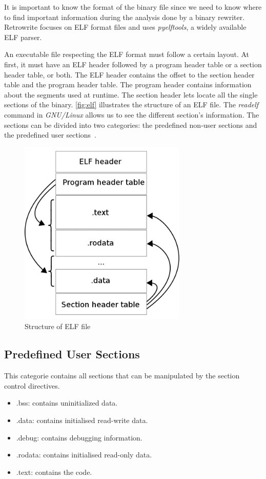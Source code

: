 \documentclass[a4paper,11pt,oneside]{report}
\newcommand{\sysname}{Retrowrite\xspace}
\begin{document}
It is important to know the format of the binary file since we need to know
where to find important information during the analysis done by a binary
rewriter. \sysname focuses on ELF format files and uses \textit{pyelftools}, a
widely available ELF parser.


An executable file respecting the ELF format must follow a certain layout. At
first, it must have an ELF header followed by a program header table or a section
header table, or both. 
The ELF header contains the offset to the section header table and the program
header table. The program header contains information about the segments used
at runtime. The section header lets locate all the single sections of the
binary. \autoref{fig:elf} illustrates the structure of an ELF file. The
\textit{readelf}~\cite{readelfMan} command in \textit{GNU/Linux} allows us to
see the different section's information. The sections can be divided into two
categories: the predefined non-user sections and the predefined user
sections~\cite{sparc}.

\begin{figure}[H]
    \centering
    \includegraphics[width=8cm]{elf_structure.png} 
    \caption{Structure of ELF file}
    \label{fig:elf}
\end{figure}

\subsection{Predefined User Sections}
This categorie contains all sections that can be manipulated by the section
control directives.
\begin{itemize}
    \item    .bss: contains uninitialized data.
    \item    .data: contains initialised read-write data.
    \item    .debug: contains debugging information.
    \item    .rodata: contains initialised read-only data.
    \item    .text: contains the code.
\end{itemize}
\end{document}
